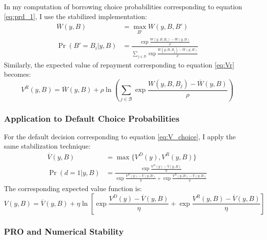 \documentclass[12pt]{article}
\theoremstyle{plain}
\begin{document}
In my computation of borrowing choice probabilities corresponding to equation
\eqref{eq:prd_1}, I use the stabilized implementation:
\begin{align}
	\overline{W}(y,B) & = \max_{B'} W(y,B,B')                                                                                                          \\
	\Pr(B'=B_i|y,B)   & = \frac{\exp\frac{W(y,B,B_i)-\overline{W}(y,B)}{\rho}}{\sum_{j \in \mathcal{B}} \exp\frac{W(y,B,B_j)-\overline{W}(y,B)}{\rho}}
\end{align}
Similarly, the expected value of repayment corresponding to equation
\eqref{eq:Vr} becomes:
\begin{equation}
	V^R(y,B) = \overline{W}(y,B) + \rho \ln\left(\sum_{j \in \mathcal{B}} \exp\frac{W(y,B,B_j)-\overline{W}(y,B)}{\rho}\right)
\end{equation}

\subsubsection{Application to Default Choice Probabilities}

For the default decision corresponding to equation \eqref{eq:V_choice}, I apply
the same stabilization technique:
\begin{align}
	\overline{V}(y,B) & = \max\{V^D(y), V^R(y,B)\}                                                                                                                  \\
	\Pr(d=1|y,B)      & = \frac{\exp\frac{V^D(y)-\overline{V}(y,B)}{\eta}}{\exp\frac{V^D(y)-\overline{V}(y,B)}{\eta} + \exp\frac{V^R(y,B)-\overline{V}(y,B)}{\eta}}
\end{align}
The corresponding expected value function is:
\begin{equation}
	V(y,B) = \overline{V}(y,B) + \eta \ln\left[\exp\frac{V^D(y)-\overline{V}(y,B)}{\eta} + \exp\frac{V^R(y,B)-\overline{V}(y,B)}{\eta}\right]
\end{equation}

\subsubsection{PRO and Numerical Stability}
\end{document}
